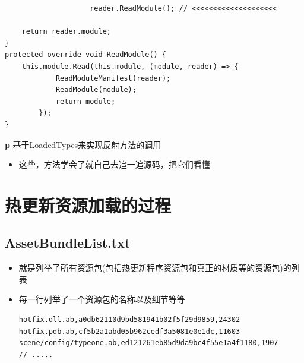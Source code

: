 \documentclass[9pt, b5paper]{article}
\begin{document}
\begin{enumerate}
\begin{enumerate}
\begin{itemize}
\begin{verbatim}
                    reader.ReadModule(); // <<<<<<<<<<<<<<<<<<<< 

    return reader.module;
}
protected override void ReadModule() {
    this.module.Read(this.module, (module, reader) => {
            ReadModuleManifest(reader);
            ReadModule(module);
            return module;
        });
}
\end{verbatim}
\end{itemize}
\textbf{p} 基于LoadedTypes来实现反射方法的调用
\begin{itemize}
\item 这些，方法学会了就自己去追一追源码，把它们看懂
\end{itemize}
\end{enumerate}
\end{enumerate}

\section{热更新资源加载的过程}
\label{sec-11}
\subsection{AssetBundleList.txt}
\label{sec-11-1}
\begin{itemize}
\item 就是列举了所有资源包(包括热更新程序资源包和真正的材质等的资源包)的列表
\item 每一行列举了一个资源包的名称以及细节等等
\begin{verbatim}
hotfix.dll.ab,a0db62110d9bd581941b02f5f29d9859,24302
hotfix.pdb.ab,cf5b2a1abd05b962cedf3a5081e0e1dc,11603
scene/config/typeone.ab,ed121261eb85d9da9bc4f55e1a4f1180,1907
// .....
\end{verbatim}
\end{itemize}
\end{document}
